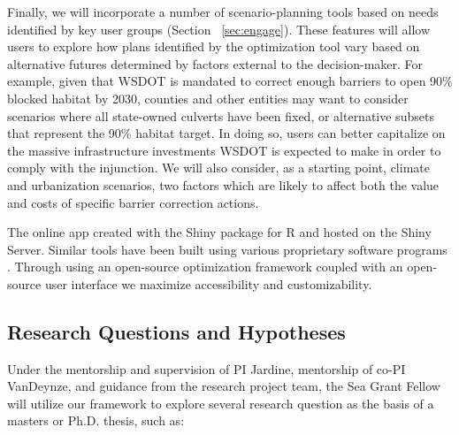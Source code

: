 \documentclass[12pt]{elsarticle}
\begin{document}
Finally, we will incorporate a number of scenario-planning tools based on needs identified by key user groups (Section ~\ref{sec:engage}). These features will allow users to explore how plans identified by the optimization tool vary based on alternative futures determined by factors external to the decision-maker. For example, given that WSDOT is mandated to correct enough barriers to open 90\% blocked habitat by 2030, counties and other entities may want to consider scenarios where all state-owned culverts have been fixed, or alternative subsets that represent the 90\% habitat target. In doing so, users can better capitalize on the massive infrastructure investments WSDOT is expected to make in order to comply with the injunction. We will also consider, as a starting point, climate and urbanization scenarios, two factors which are likely to affect both the value and costs of specific barrier correction actions.
  
The online app created with the Shiny package for R and hosted on the Shiny Server. Similar tools have been built using various proprietary software programs \citep{ohanley_optipass_2015, moody_pet_2017, mcmanamay_commonalities_2019}. Through using an open-source optimization framework coupled with an open-source user interface we maximize accessibility and customizability. 

\subsection*{Research Questions and Hypotheses}

Under the mentorship and supervision of PI Jardine, mentorship of co-PI VanDeynze, and guidance from the research project team, the Sea Grant Fellow will utilize our framework to explore several research question as the basis of a masters or Ph.D. thesis, such as: 
\end{document}
